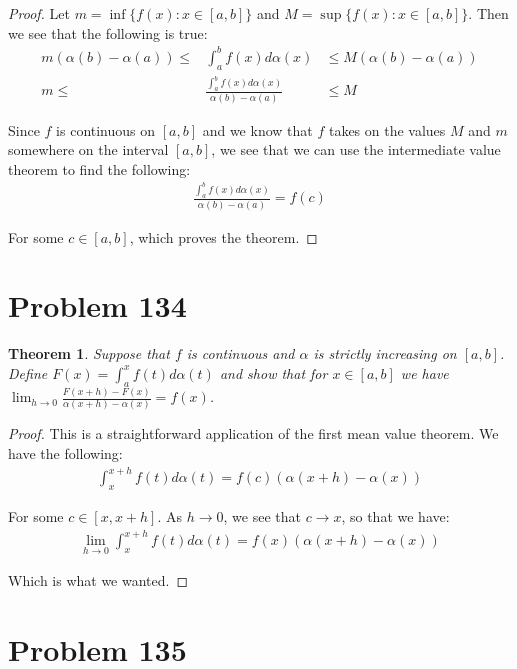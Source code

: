 \documentclass[psamsfonts]{amsart}
\newtheorem{thm}{Theorem}[section]
\theoremstyle{definition}
\theoremstyle{remark}
\numberwithin{equation}{section}
\begin{document}
\begin{proof}
Let $m = \inf \{ f(x): x \in [a,b] \}$ and $M = \sup \{ f(x): x \in [a,b] \}$. Then we see that the following is true:
\begin{eqnarray}
m (\alpha(b) - \alpha(a)) \leq& \int_a^b f(x) d \alpha(x) &\leq M (\alpha(b) - \alpha(a)) \\
m \leq& \frac{\int_a^b f(x) d \alpha(x)}{\alpha(b) - \alpha(a)} &\leq M
\end{eqnarray}

Since $f$ is continuous on $[a,b]$ and we know that $f$ takes on the values $M$ and $m$ somewhere on the interval $[a,b]$, we see that we can use the intermediate value theorem to find the following:
\begin{eqnarray}
\frac{\int_a^b f(x) d \alpha(x)}{\alpha(b) - \alpha(a)} = f(c) 
\end{eqnarray}

For some $c \in [a,b]$, which proves the theorem.
\end{proof}

\section{Problem 134}

\begin{thm}
Suppose that $f$ is continuous and $\alpha$ is strictly increasing on $[a,b]$. Define $F(x) = \int_a^x f(t) d \alpha(t)$ and show that for $x \in [a,b]$ we have $\lim_{h \to 0} \frac{F(x+h) - F(x)}{\alpha(x+h) - \alpha(x)} = f(x)$. 
\end{thm}

\begin{proof}
This is a straightforward application of the first mean value theorem. We have the following:
\begin{eqnarray}
\int_x^{x+h} f(t) d \alpha(t) = f(c) (\alpha(x+h) - \alpha(x))
\end{eqnarray}

For some $c \in [x, x+h]$. As $ h \to 0$, we see that $c \to x$, so that we have:
\begin{eqnarray}
\lim_{h \to 0} \int_x^{x+h} f(t) d \alpha(t) = f(x) (\alpha(x+h) - \alpha(x))
\end{eqnarray}

Which is what we wanted. 
\end{proof}

\section{Problem 135}
\end{document}
